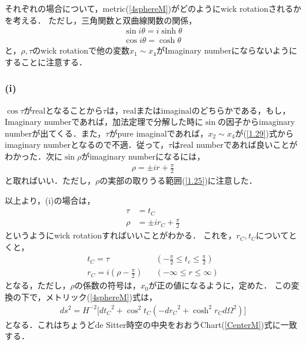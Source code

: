 それぞれの場合について，metric(\ref{4sphereM})がどのようにwick rotationされるかを考える．
ただし，三角関数と双曲線関数の関係，
\begin{eqnarray}
  \label{1.29}
  \sin{i\theta}=i\sinh{\theta} \\
  \label{1.30}
    \cos{i\theta}=\cosh{\theta}
\end{eqnarray}
と，$\rho,\tau$のwick rotationで他の変数$x_1\sim x_4$がImaginary numberにならないようにすることに注意する．
\subsubsection{(i)}
$\cos\tau$がrealとなることから$\tau$は，realまたはimaginalのどちらかである，もし，Imaginary numberであれば，加法定理で分解した時に$\sin$の因子からimaginary numberが出てくる．また，$\tau$がpure imaginalであれば，$x_2\sim x_4$が(\ref{1.29})式からimaginary numberとなるので不適．従って，$\tau$はreal numberであれば良いことがわかった．次に$\sin\rho$がimaginary numberになるには，
\begin{eqnarray}
  \rho=\pm ir+\frac{\pi}{2}
\end{eqnarray}
と取ればいい．ただし，$\rho$の実部の取りうる範囲(\ref{1.25})に注意した．

以上より，(i)の場合は，
\begin{align}
  \tau&=t_{C} \\
  \rho &= \pm ir_{C} +\frac{\pi}{2}
\end{align}
というようにwick rotationすればいいことがわかる．
これを，$r_{C},t_{C}$についてとくと，
\begin{align}
  t_{C} = \tau& &(-\frac{\pi}{2} \leqslant t_{c} \leqslant \frac{\pi}{2}) \\
  r_{C} =i(\rho-\frac{\pi}{2})& &(-\infty \leqslant r \leqslant \infty)
\end{align}
となる，ただし，$\rho$の係数の符号は，$x_0$が正の値になるように，定めた．
この変換の下で，メトリック(\ref{4sphereM})式は，
\begin{align}
  ds^2=H^{-2}\biggl[{dt_{C}}^2+\cos^2t_{C}(-{dr_{C}}^2+\cosh^2r_{C}d\Omega^2) \biggr]
\end{align}
となる．これはちょうどde Sitter時空の中央をおおうChart(\ref{CenterM})式に一致する．
